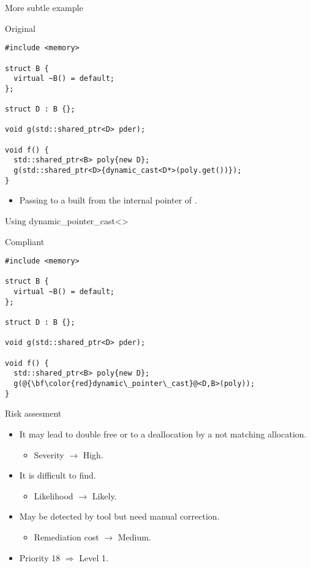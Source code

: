 \begin{frame}[t,fragile]{More subtle example}
\begin{block}{Original}
\begin{lstlisting}
#include <memory>

struct B {
  virtual ~B() = default;
};

struct D : B {};

void g(std::shared_ptr<D> pder);

void f() {
  std::shared_ptr<B> poly{new D};
  g(std::shared_ptr<D>{dynamic_cast<D*>(poly.get())});
}
\end{lstlisting}
\end{block}
\vfill
\begin{itemize}
  \item Passing to  a  built from the
        internal pointer of .
\end{itemize}
\end{frame}

\begin{frame}[t,fragile]{Using dynamic\_pointer\_cast<>}
\begin{block}{Compliant}
\begin{lstlisting}[escapechar=@]
#include <memory>

struct B {
  virtual ~B() = default;
};

struct D : B {};

void g(std::shared_ptr<D> pder);

void f() {
  std::shared_ptr<B> poly{new D};
  g(@{\bf\color{red}dynamic\_pointer\_cast}@<D,B>(poly));
}
\end{lstlisting}
\end{block}
\vfill
\end{frame}

\begin{frame}[t]{Risk assesment}
\begin{itemize}
  \item It may lead to double free or to a deallocation by a not matching allocation.
    \begin{itemize}
      \item Severity $\rightarrow$ High.
    \end{itemize}

  \vfill
  \item It is difficult to find.
    \begin{itemize}
      \item Likelihood $\rightarrow$ Likely.
    \end{itemize}

  \vfill
  \item May be detected by tool but need manual correction.
    \begin{itemize}
      \item Remediation cost $\rightarrow$ Medium.
    \end{itemize}

  \vfill
  \item Priority 18 $\Rightarrow$ Level 1.
\end{itemize}
\end{frame}
